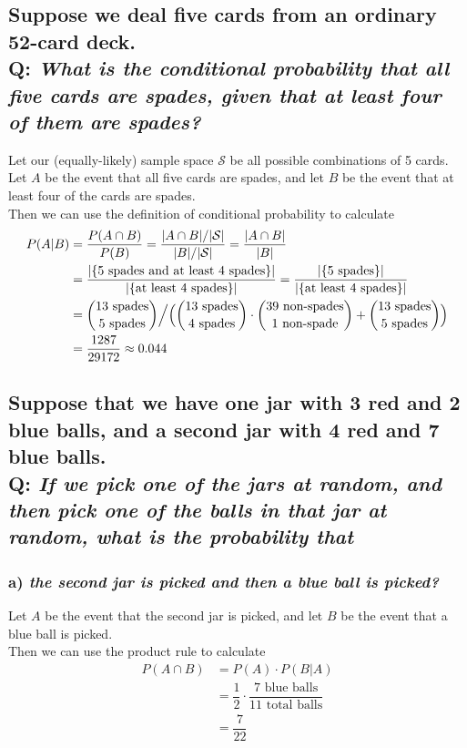 \documentclass{article}
\begin{document}
\subsection*{{\normalsize Suppose we deal five cards from an ordinary 52-card deck.}\\
Q: {\em What is the conditional probability that all five cards are spades, given that at least four of them are spades?}}
Let our (equally-likely) sample space $\mathcal{S}$ be all possible combinations of 5 cards. Let $A$ be the event that all five cards are spades, and let $B$ be the event that at least four of the cards are spades.\\
Then we can use the definition of conditional probability to calculate
\begin{align*}
P(A|B)&=\dfrac{P(A\cap B)}{P(B)}=\dfrac{|A\cap B|/|\mathcal{S}|}{|B|/|\mathcal{S}|}=\dfrac{|A\cap B|}{|B|}\\
&=\dfrac{|\{\text{5 spades and at least 4 spades}\}|}{|\{\text{at least 4 spades}\}|}=\dfrac{|\{\text{5 spades}\}|}{|\{\text{at least 4 spades}\}|}\\
&=\dbinom{13\text{ spades}}{5\text{ spades}}\Big/\Big({\dbinom{13\text{ spades}}{4\text{ spades}}\cdot\binom{39\text{ non-spades}}{1\text{ non-spade}}+\binom{13\text{ spades}}{5\text{ spades}}}\Big)\\
&=\dfrac{1287}{29172}\approx 0.044
\end{align*}

\subsection*{{\normalsize Suppose that we have one jar with 3 red and 2 blue balls, and a second jar with 4 red and 7 blue balls.}\\
Q: {\em If we pick one of the jars at random, and then pick one of the balls in that jar at random, what is the probability that}}
\subsubsection*{a) {\em the second jar is picked and then a blue ball is picked?}}

Let $A$ be the event that the second jar is picked, and let $B$ be the event that a blue ball is picked.\\
Then we can use the product rule to calculate
\begin{align*}
P(A\cap B)&=P(A)\cdot P(B|A)\\
&=\dfrac{1}{2}\cdot\dfrac{7\text{ blue balls}}{11\text{ total balls}}\\
&=\dfrac{7}{22}
\end{align*}
\end{document}
